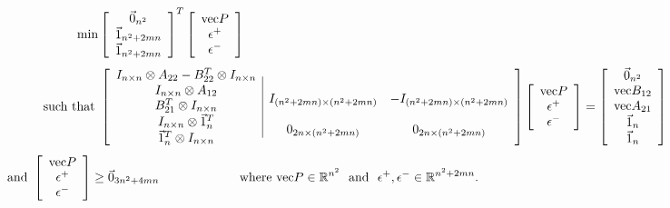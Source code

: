 \documentclass[12pt]{article}
\newcommand{\R}{\mathbb{R}}
\begin{document}
\[ \min
\left [ \begin{array}{c} \vec{0}_{n^2} \\ \vec{1}_{n^2+2mn} \\ \vec{1}_{n^2+2mn} \end{array}
\right ] ^T
\left [ \begin{array}{c} \textup{vec}P \\ \epsilon^+ \\ \epsilon^- \end{array}
\right ] \ \ \ \ \ \ \ \ \ \ \ \ \ \ \ \ \ \ \ \ \ \ \ \ \ \ \ \ \ \ \ \ \ \
 \ \ \ \ \ \ \ \ \ \ \ \ \ \ \ \ \ \ \ \ \ \ \ \ \ \ \ \ \ \ \ \ \ \ \ \ \ \ \
 \ \ \ \ \ \ \ \ \ \ \ \ \ \ \ \ \ \ \
\]
\[ \mbox{such that }
\left [ \begin{array}{c} I_{n \times n} \otimes A_{22}
 -B^T_{22} \otimes I_{n \times n}
  \\ I_{n \times n} \otimes  A_{12}
  \\ B^T_{21} \otimes I_{n \times n}
  \\ I_{n \times n}  \otimes \vec{1}^T_{n}
  \\ \vec{1}^T_{n} \otimes I_{n \times n}
   \end{array}
 \begin{array}{|cc}  & \\  I_{(n^2 + 2mn)\times (n^2+2mn)} &
 -I_{(n^2+2mn) \times (n^2+2mn)} \\ &  \\ 0_{2n \times (n^2+2mn)} & 0_{2n\times (n^2+2mn)}
 \end{array}
   \right ]
\left [ \begin{array}{c} \textup{vec}P \\ \epsilon^+ \\ \epsilon^- \end{array}
\right ]
=
\left [ \begin{array}{c}  \vec{0}_{n^2} \\ \textup{vec}B_{12} \\
\textup{vec}A_{21}\\ \vec{1}_n \\ \vec{1}_n  \end{array} \right ]
\]
\[ \mbox{and } \left [ \begin{array}{c} \textup{vec}P \\ \epsilon^+ \\ \epsilon^- \end{array}
\right ] \geq \vec{0}_{3n^2+4mn} \ \ \ \ \ \ \ \
\ \ \ \ \ \ \ \ \ \ \
\mbox{where } \mbox{vec}P \in \R^{n^2}
\ \ \mbox{and} \ \
\epsilon^+,\epsilon^- \in \R^{n^2+2mn} .
 \ \ \ \ \
\ \ \ \ \ \ \ \ \ \ \ \ \ \ \ \ \ \ \ \ \ \ \ \ \ \ \ \ \ \
\ \ \ \ \ \ \ \ \ \ \ \ \ \ \ \ \ \
\]
\end{document}
